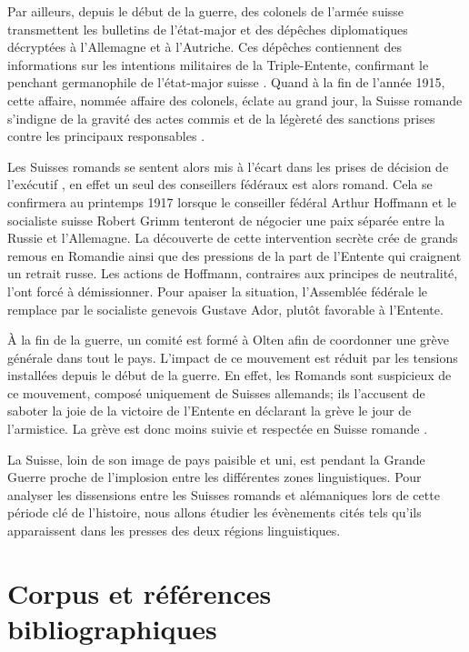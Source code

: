 \documentclass[french,a4paper]{article}
\begin{document}
Par ailleurs, depuis le début de la guerre, des colonels de l'armée suisse transmettent les bulletins de l'état-major et des dépêches diplomatiques décryptées à l'Allemagne et à l'Autriche.
Ces dépêches contiennent des informations sur les intentions militaires de la Triple-Entente, confirmant le penchant germanophile de l'état-major suisse \cite{whistle_blower}.
Quand à la fin de l'année 1915, cette affaire, nommée affaire des colonels, éclate au grand jour, la Suisse romande s'indigne de la gravité des actes commis et de la légèreté des sanctions prises contre les principaux responsables \cite{verdict}.

Les Suisses romands se sentent alors mis à l'écart dans les prises de décision de l'exécutif \cite{exclusion}, en effet un seul des conseillers fédéraux est alors romand.
Cela se confirmera au printemps 1917 lorsque le conseiller fédéral Arthur Hoffmann et le socialiste suisse Robert Grimm tenteront de négocier une paix séparée entre la Russie et l'Allemagne. \cite{hoffmann}
La découverte de cette intervention secrète crée de grands remous en Romandie ainsi que des pressions de la part de l'Entente qui craignent un retrait russe.
Les actions de Hoffmann, contraires aux principes de neutralité, l'ont forcé à démissionner.
Pour apaiser la situation, l'Assemblée fédérale le remplace par le socialiste genevois Gustave Ador, plutôt favorable à l'Entente.

À la fin de la guerre, un comité est formé à Olten afin de coordonner une grève générale dans tout le pays.
L'impact de ce mouvement est réduit par les tensions installées depuis le début de la guerre.
En effet, les Romands sont suspicieux de ce mouvement, composé uniquement de Suisses allemands; ils l'accusent de saboter la joie de la victoire de l'Entente en déclarant la grève le jour de l'armistice.
La grève est donc moins suivie et respectée en Suisse romande \cite{sprachenfrieden}.

La Suisse, loin de son image de pays paisible et uni, est pendant la Grande Guerre proche de l'implosion entre les différentes zones linguistiques.
Pour analyser les dissensions entre les Suisses romands et alémaniques lors de cette période clé de l'histoire, nous allons étudier les évènements cités tels qu'ils apparaissent dans les presses des deux régions linguistiques.


\section*{Corpus et références bibliographiques}
\end{document}
